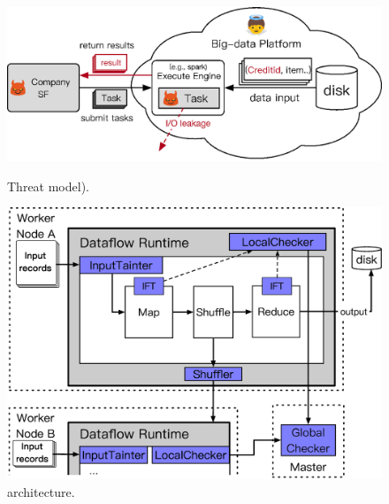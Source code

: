 \begin{figure}[h]
    \centering
    \begin{minipage}{.48\textwidth}    
        \vspace{-.15in}
        \includegraphics[width=0.31\textheight]{figures/threat_private.ps}
        \vspace{-.3in}         
        \caption{Threat model).}
        \label{fig:falcon-arch}
    \end{minipage}
    \centering
    \begin{minipage}{0.48\textwidth}
        \vspace{-.17in}
        \includegraphics[width=0.34\textheight]{figures/kakute_arch.ps}
        \vspace{-.32in}
        \caption{\kakute architecture.}
        \label{fig:falcon-protocol}
    \end{minipage}
\end{figure}

